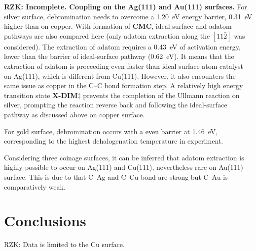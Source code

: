 \documentclass[%
 reprint,
 amsmath,amssymb,
 aps,
prb,
floatfix,
]{revtex4-2}
\newcommand{\zhzh}{\color{blue}}
\newcommand{\zhzh}{\color{blue}}
\newcommand{\comm}{\color{ForestGreen}} %
\begin{document}
{\zhzh 

\textbf{{\comm RZK: Incomplete.} Coupling on the Ag(111) and Au(111) surfaces.}
%
For silver surface, debromination needs to overcome a \SI{1.20}{\electronvolt} energy barrier, \SI{0.31}{\electronvolt} higher than on copper. With formation of \textbf{CMC}, ideal-surface and adatom pathways are also compared here (only adatom extraction along the $[11\bar{2}]$ was considered). The extraction of adatom requires a \SI{0.43}{\electronvolt} of activation energy, lower than the barrier of ideal-surface pathway (\SI{0.62}{\electronvolt}). It means that the extraction of adatom is proceeding even faster than ideal surface atom catalyst on Ag(111), which is different from Cu(111). However, it also encounters the same issue as copper in the C--C bond formation step. A relatively high energy transition state \textbf{X-DIM$\ddagger$} prevents the completion of the Ullmann reaction on silver, prompting the reaction reverse back and following the ideal-surface pathway as discussed above on copper surface. 

For gold surface, debromination occurs with a even barrier at \SI{1.46}{\electronvolt}, corresponding to the highest dehalogenation temperature in experiment.

Considering three coinage surfaces, it can be inferred that adatom extraction is highly possible to occur on Ag(111) and Cu(111), nevertheless rare on Au(111) surface. This is due to that C--Ag and C--Cu bond are strong but C--Au is comparatively weak.
 
}

\section{Conclusions}

{\comm RZK: Data is limited to the Cu surface.}
\end{document}
